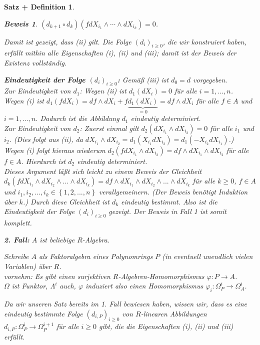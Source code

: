 \documentclass[a4paper,12pt]{scrbook}
\theoremstyle{break}
\newtheorem{SatzDef}[Satz]{Satz + Definition}
\theoremstyle{nonumberbreak}
\newtheorem{Bew}{Beweis}
\theoremstyle{nonumberplain}
\begin{document}
\begin{SatzDef}
\begin{Bew}
$\left(d_{k+1}\circ d_k\right)\left(fdX_{i_1}\wedge \cdots \wedge dX_{i_k}\right) = 0$.

Damit ist gezeigt, dass (ii) gilt. Die Folge $\left(d_i\right)_{i\geq 0}$, die wir konstruiert haben, erfüllt mithin alle Eigenschaften (i), (ii) und (iii); damit ist der Beweis der Existenz vollständig.

\textbf{Eindeutigkeit der Folge $\left(d_i\right)_{i\geq 0}$:} Gemäß (iii) ist $d_0=d$ vorgegeben.\\

Zur Eindeutigkeit von $d_1$: Wegen (ii) ist $d_1(dX_i)=0$ für alle $i=1, \ldots, n$.\\
Wegen (i) ist $d_1(fdX_i)=df\wedge dX_i+f\underbrace{d_1(dX_i)}_{=0} = df \wedge dX_i$ für alle $f\in A$ und $i=1,\ldots ,n$. Dadurch ist die Abbildung $d_1$ eindeutig determiniert. \\

Zur Eindeutigkeit von $d_2$: Zuerst einmal gilt $d_2(dX_{i_1}\wedge dX_{i_2})=0$ für alle $i_1$ und $i_2$. (Dies folgt aus (ii), da $dX_{i_1}\wedge dX_{i_2}=d_1(X_{i_1} dX_{i_2})=d_1(-X_{i_2}dX_{i_1})$.)\\
Wegen (i) folgt hieraus wiederum $d_2(fdX_{i_1}\wedge dX_{i_2})=df\wedge dX_{i_1}\wedge dX_{i_2}$ für alle $f\in A$. Hierdurch ist $d_2$ eindeutig determiniert.\\

Dieses Argument läßt sich leicht zu einem Beweis der Gleichheit
$d_k\left(f dX_{i_1} \wedge dX_{i_2} \wedge ... \wedge dX_{i_k}\right) = df \wedge dX_{i_1} \wedge dX_{i_2} \wedge ... \wedge dX_{i_k}$
für alle $k\geq 0$, $f\in A$ und $i_1,i_2,...,i_k\in\left\{1,2,...,n\right\}$ verallgemeinern. (Der Beweis benötigt Induktion über $k$.) Durch diese Gleichheit ist $d_k$ eindeutig bestimmt. Also ist die Eindeutigkeit der Folge $\left(d_i\right)_{i\geq 0}$ gezeigt. Der Beweis in Fall 1 ist somit komplett.

\textbf{2. Fall:} $A$ ist beliebige $R$-Algebra.

Schreibe $A$ als Faktoralgebra eines Polynomrings $P$ (in eventuell unendlich vielen Variablen) über $R$.\\
vornehm: Es gibt einen surjektiven $R$-Algebren-Homomorphismus $\varphi:P\to A$.\\
$\Omega$ ist Funktor, $\Lambda^i$ auch, $\varphi$ induziert also einen Homomorphismus 
$\varphi_i: \Omega_P^{i}\to \Omega_A^{i}$.

Da wir unseren Satz bereits im 1. Fall bewiesen haben, wissen wir, dass es eine eindeutig bestimmte Folge $\left(d_{i,P}\right)_{i\geq 0}$ von $R$-linearen Abbildungen $d_{i,P} : \Omega^i_P \rightarrow \Omega^{i+1}_P$ für alle $i \geq 0$ gibt, die die Eigenschaften (i), (ii) und (iii) erfüllt.


\end{Bew}
\end{SatzDef}
\end{document}

